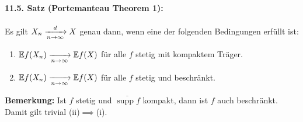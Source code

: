 \documentclass[11pt]{report}
\begin{document}
\paragraph{11.5. Satz (Portemanteau Theorem 1):} Es gilt $X_n\nto{d}{n\to\infty}X$ genau dann, wenn eine der folgenden Bedingungen erf\"ullt ist:
\begin{enumerate}[label=(\roman*)]
    \item $\E f(X_n)\nto{}{n\to\infty}\E f(X)$ f\"ur alle $f$ stetig mit kompaktem Tr\"ager.
    \item $\E f(X_n)\nto{}{n\to\infty}\E f(X)$ f\"ur alle $f$ stetig und beschr\"ankt.
\end{enumerate}

\textbf{Bemerkung:} Ist $f$ stetig und $\overline{\operatorname{supp}f}$ kompakt, dann ist $f$ auch beschr\"ankt. Damit gilt trivial (ii)$\implies $(i).
\end{document}
